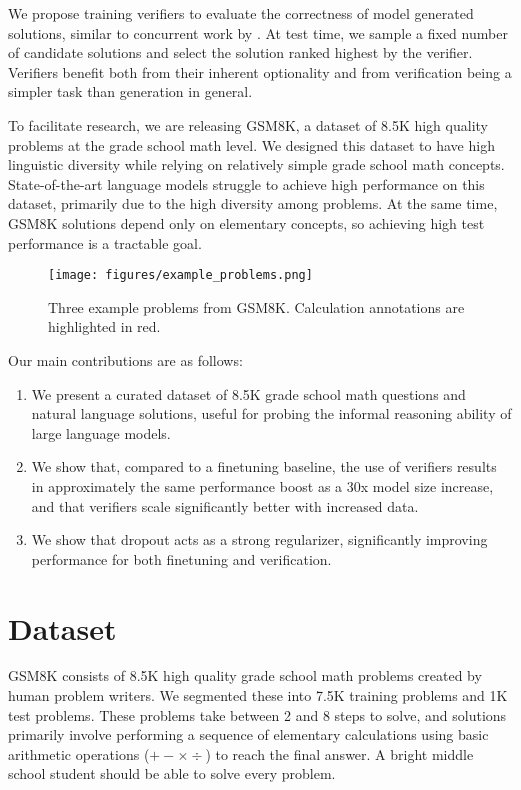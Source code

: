 {We propose training verifiers to evaluate the correctness of model generated solutions, similar to concurrent work by \cite{shen2021generate}. At test time, we sample a fixed number of candidate solutions and select the solution ranked highest by the verifier. Verifiers benefit both from their inherent optionality and from verification being a simpler task than generation in general.

To facilitate research, we are releasing GSM8K, a dataset of 8.5K high quality problems at the grade school math level. We designed this dataset to have high linguistic diversity while relying on relatively simple grade school math concepts. State-of-the-art language models struggle to achieve high performance on this dataset, primarily due to the high diversity among problems. At the same time, GSM8K solutions depend only on elementary concepts, so achieving high test performance is a tractable goal.

\begin{figure*}
\centering
\texttt{[image: figures/example\_problems.png]}
\caption{Three example problems from GSM8K. Calculation annotations are highlighted in red.}
\label{fig:dataset_examples}
\end{figure*}

Our main contributions are as follows:

\begin{enumerate}
\item We present a curated dataset of 8.5K grade school math questions and natural language solutions, useful for probing the informal reasoning ability of large language models.

\item We show that, compared to a finetuning baseline, the use of verifiers results in approximately the same performance boost as a 30x model size increase, and that verifiers scale significantly better with increased data.

\item We show that dropout acts as a strong regularizer, significantly improving performance for both finetuning and verification.
\end{enumerate}

\section{Dataset} \label{section:dataset}

GSM8K consists of 8.5K high quality grade school math problems created by human problem writers. We segmented these into 7.5K training problems and 1K test problems. These problems take between 2 and 8 steps to solve, and solutions primarily involve performing a sequence of elementary calculations using basic arithmetic operations ($+ - \times \div$) to reach the final answer. A bright middle school student should be able to solve every problem.

}
